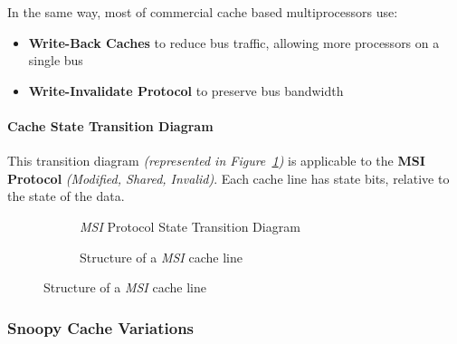 \documentclass[english]{article}
\begin{document}
\bigskip
In the same way, most of commercial cache based multiprocessors use:

\begin{itemize}
  \item \textbf{Write-Back Caches} to reduce bus traffic, allowing more processors on a single bus
  \item \textbf{Write-Invalidate Protocol} to preserve bus bandwidth
\end{itemize}

\paragraph{Cache State Transition Diagram}

This transition diagram \textit{(represented in Figure~\ref{subfig:MSI-state-transition-diagram})} is applicable to the \textbf{MSI Protocol} \textit{(Modified, Shared, Invalid)}.
Each cache line has state bits, relative to the state of the data.

\begin{figure}[htbp]
  \bigskip
  \centering
  \begin{subfigure}[b]{0.6\textwidth}

    \caption{\textit{MSI} Protocol State Transition Diagram}
    \label{subfig:MSI-state-transition-diagram}
    \bigskip
  \end{subfigure}
  \begin{subfigure}[b]{0.3\textwidth}
    \centering
    \caption{Structure of a \textit{MSI} cache line}
    \label{subfig:MSI-cache-line}
  \end{subfigure}
\end{figure}

\subsubsection{Snoopy Cache Variations}
\end{document}
